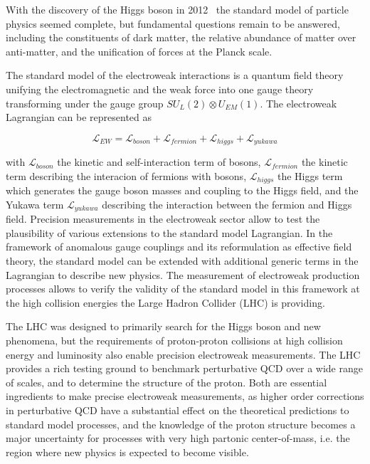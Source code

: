 \label{ss-intro-motivation}

With the discovery of the Higgs boson in 2012~\cite{Chatrchyan201230,
Aad20121} the standard model of particle physics seemed complete, but
fundamental questions remain to be answered, including the
constituents of dark matter, the relative abundance of matter over
anti-matter, and the unification of forces at the Planck scale.

The standard model of the electroweak interactions is a quantum field
theory unifying the electromagnetic and the weak force into one gauge
theory transforming under the gauge group $SU_L(2) \otimes U_{EM}(1)$.
The electroweak Lagrangian can be represented as

$$ \mathcal{L}_{EW} = \mathcal{L}_{boson} + \mathcal{L}_{fermion} + \mathcal{L}_{higgs} + \mathcal{L}_{yukawa} $$

with $\mathcal{L}_{boson}$ the kinetic and self-interaction term of
bosons, $\mathcal{L}_{fermion}$ the kinetic term describing the
interacion of fermions with bosons, $\mathcal{L}_{higgs}$ the Higgs
term which generates the gauge boson masses and coupling to the Higgs
field, and the Yukawa term $\mathcal{L}_{yukawa}$ describing the
interaction between the fermion and Higgs field.
Precision measurements in the electroweak sector allow to test the
plausibility of various extensions to the standard model
Lagrangian. In the framework of anomalous gauge couplings and its
reformulation as effective field theory, the standard model can be
extended with additional generic terms in the Lagrangian to describe
new physics. The measurement of electroweak production processes
allows to verify the validity of the standard model in this framework
at the high collision energies the Large Hadron Collider (LHC) is
providing.

The LHC was designed to primarily search for the Higgs boson and new
phenomena, but the requirements of proton-proton collisions at high
collision energy and luminosity also enable precision electroweak
measurements. The LHC
provides a rich testing ground to benchmark perturbative QCD over a
wide range of scales, and to determine the structure of the proton.
Both are essential ingredients to make precise electroweak
measurements, as higher order corrections in perturbative QCD have a
substantial effect on the theoretical predictions to standard model
processes, and the knowledge of the proton structure becomes a major
uncertainty for processes with very high partonic center-of-mass,
i.e. the region where new physics is expected to become visible.

